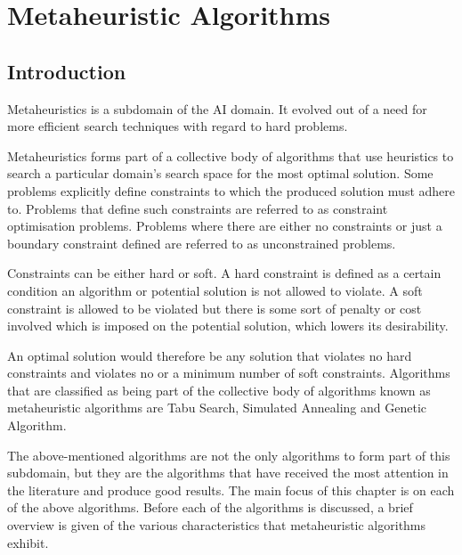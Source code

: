 \chapter{Metaheuristic Algorithms}
\label{chpt:heuristic}
\section{Introduction}
Metaheuristics is a subdomain of the \gls{AI} domain\cite{AIModernApproach}. It evolved out of a need for more efficient search techniques with regard to hard problems. 

Metaheuristics forms part of a collective body of algorithms that use heuristics to search a particular domain's search space for the most optimal solution\cite{AIModernApproach,NatureInspiredMetaHeuristic}. Some problems explicitly define constraints to which the produced solution must adhere to. Problems that define such constraints are referred to as constraint optimisation problems\cite{FundamentalSwarm}. Problems where there are either no constraints or just a boundary constraint  defined are referred to as unconstrained problems\cite{FundamentalSwarm}.

Constraints can be either hard or soft. A hard constraint is defined as a certain condition an algorithm or potential solution is not allowed to violate\cite{AIModernApproach,NatureInspiredMetaHeuristic,Karen2004,Eisenblatter}. A soft constraint is allowed to be violated but there is some sort of penalty or cost involved which is imposed on the potential solution, which lowers its desirability\cite{AIModernApproach,NatureInspiredMetaHeuristic,Karen2004,Eisenblatter}. 

An optimal solution would therefore be any solution that violates no hard constraints and violates no or a minimum number of soft constraints\cite{AIModernApproach,NatureInspiredMetaHeuristic,Karen2004,Eisenblatter}. Algorithms that are classified as being part of the collective body of algorithms known as metaheuristic algorithms are Tabu Search\cite{TabuVechicleRoutingWithTimeWindows,TabuCSP}, Simulated Annealing \cite{SASingleMultiObj,CurveFittingSA} and Genetic Algorithm\cite{GATSP, GeostatisticalGA}.

The above-mentioned algorithms are not the only algorithms to form part of this subdomain, but they are the algorithms that have received the most attention in the literature and produce good results\cite{SweepMeta}.
The main focus of this chapter is on each of the above algorithms. Before each of the algorithms is discussed, a brief overview is given of the various characteristics that metaheuristic algorithms exhibit. 

